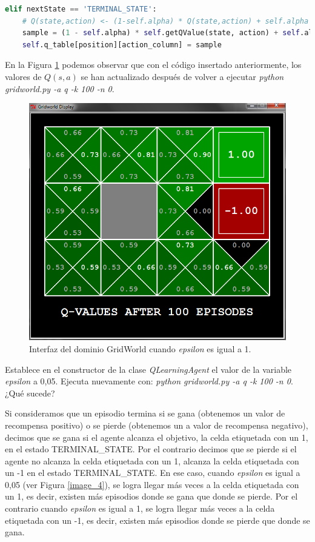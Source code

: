 \documentclass[11pt]{exam}
\begin{document}
\begin{questions}
\begin{lstlisting}[language=Python]
elif nextState == 'TERMINAL_STATE':
	# Q(state,action) <- (1-self.alpha) * Q(state,action) + self.alpha * (reward + 0)
	sample = (1 - self.alpha) * self.getQValue(state, action) + self.alpha * (reward + 0)
	self.q_table[position][action_column] = sample
\end{lstlisting}

En la Figura \ref{image_3} podemos observar que con el código insertado anteriormente, los valores de $Q(s,a)$ se han actualizado después de volver a ejecutar \textit{python gridworld.py -a q -k 100 -n 0}.

\begin{figure}[h]
	\centering
	\includegraphics[scale=0.5]{image_3}
	\caption{Interfaz del dominio GridWorld cuando \textit{epsilon} es igual a 1.}
	\label{image_3}
\end{figure}

{ \question Establece en el constructor de la clase \textit{QLearningAgent} el valor de la variable \textit{epsilon} a 0,05. Ejecuta nuevamente con: \textit{python gridworld.py -a q -k 100 -n 0}. ¿Qué sucede?
}

Si consideramos que un episodio termina si se gana (obtenemos un valor de recompensa positivo) o se pierde (obtenemos un a valor de recompensa negativo), decimos que se gana si el agente alcanza el objetivo, la celda etiquetada con un 1, en el estado TERMINAL\_STATE. Por el contrario decimos que se pierde si el agente no alcanza la celda etiquetada con un 1, alcanza la celda etiquetada con un -1 en el estado TERMINAL\_STATE. En ese caso, cuando \textit{epsilon} es igual a 0,05 (ver Figura \ref{image_4}), se logra llegar más veces a la celda etiquetada con un 1, es decir, existen más episodios donde se gana que donde se pierde. Por el contrario cuando \textit{epsilon} es igual a 1, se logra llegar más veces a la celda etiquetada con un -1, es decir, existen más episodios donde se pierde que donde se gana. 


\end{questions}
\end{document}
